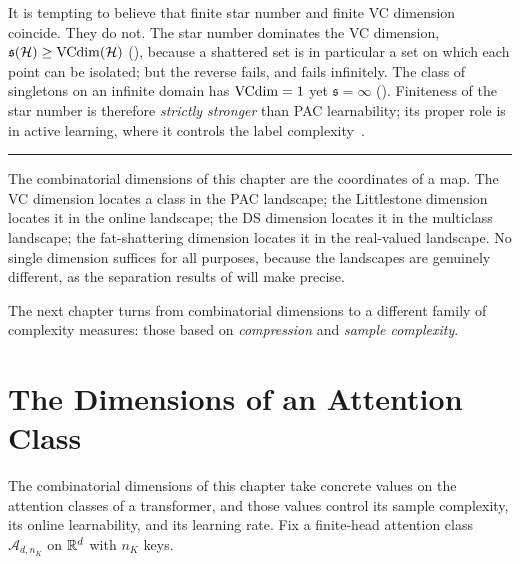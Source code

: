 \begin{remark}
\label{rmk:star-number}
It is tempting to believe that finite star number and finite VC dimension
coincide.  They do not.  The star number dominates the VC dimension,
$\mathfrak{s}(\mathcal{H}) \geq \mathrm{VCdim}(\mathcal{H})$ (),
because a shattered set is in particular a set on which each point can be
isolated; but the reverse fails, and fails infinitely.  The class of
singletons on an infinite domain has $\mathrm{VCdim} = 1$ yet $\mathfrak{s} = \infty$
(). Finiteness of the star number is therefore
\emph{strictly stronger} than PAC learnability; its
proper role is in active learning, where it controls the label
complexity~\cite{HannekeYang2015}.
\end{remark}



\bigskip
\begin{center}
\rule{0.5\textwidth}{0.4pt}
\end{center}
\bigskip

The combinatorial dimensions of this chapter are the coordinates of a map.
The VC dimension locates a class in the PAC landscape; the Littlestone
dimension locates it in the online landscape; the DS dimension locates it in
the multiclass landscape; the fat-shattering dimension locates it in the
real-valued landscape.  No single dimension suffices for all purposes, because
the landscapes are genuinely different, as the separation results of
 will make precise.

The next chapter turns from combinatorial dimensions to a different family of
complexity measures: those based on \emph{compression} and \emph{sample
complexity}.

\section{The Dimensions of an Attention Class}
\label{sec:attention-dimensions}

The combinatorial dimensions of this chapter take concrete values on the attention classes of a transformer, and those values control its sample complexity, its online learnability, and its learning rate.  Fix a finite-head attention class $\mathcal{A}_{d,n_K}$ on $\mathbb{R}^d$ with $n_K$ keys.

